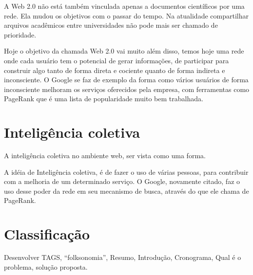 \documentclass[
	12pt,				%
	openright,			%
	twoside,			%
	a4paper,			%
	Times,
	brazil,				%
	]{abntex2}
\begin{document}
A Web 2.0 não está também vinculada apenas a documentos científicos por uma rede. Ela mudou os objetivos com o passar do tempo. Na atualidade compartilhar arquivos acadêmicos entre universidades não pode mais ser chamado de prioridade. \cite{web2.0}
\par

Hoje o objetivo da chamada Web 2.0 vai muito além disso, temos hoje uma rede onde cada usuário tem o potencial de gerar informações, de participar para construir algo tanto de forma direta e cociente quanto de forma indireta e inconsciente. O Google se faz de exemplo da forma como vários usuários de forma inconsciente melhoram os serviços oferecidos pela empresa, com ferramentas como PageRank que é uma lista de popularidade muito bem trabalhada.\cite{google, web2.0}
\par



\section{Inteligência coletiva}
A inteligência coletiva no ambiente web, ser vista como uma forma. \cite{inteligencia-coletiva, inteligencia-coletiva-web}
\par

A idéia de Inteligência coletiva, é de fazer o uso de várias pessoas, para contribuir com a melhoria de um determinado serviço. O Google, novamente citado, faz o uso desse poder da rede em seu mecanismo de busca, através do que ele chama de PageRank. \cite{google}
\par



\section{Classificação}

Desenvolver TAGS, “folksonomia”, Resumo, Introdução, Cronograma, Qual é o problema, solução proposta. \par
\end{document}
